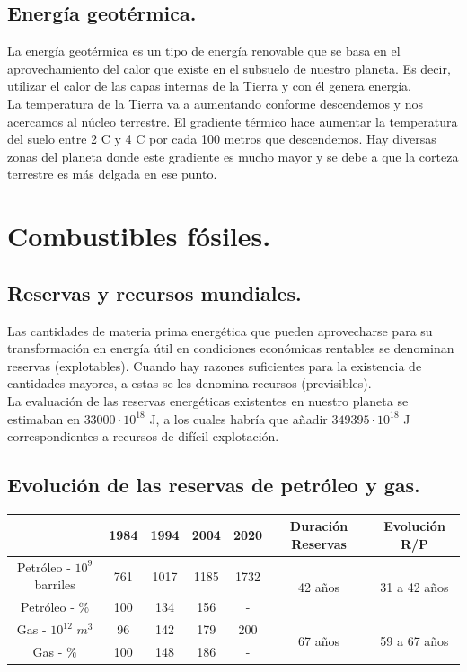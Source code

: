 			\subsection{Energía geotérmica.}
				La energía geotérmica es un tipo de energía renovable que se basa en el aprovechamiento del calor
				que existe en el subsuelo de nuestro planeta. Es decir, utilizar el calor de las capas internas de la
				Tierra y con él genera energía.\\
				\indent La temperatura de la Tierra va a aumentando conforme descendemos y nos acercamos al núcleo
				terrestre. El gradiente térmico hace aumentar la temperatura del suelo entre 2 \textdegree C y 4 \textdegree C por cada 100 metros que descendemos. Hay diversas zonas del planeta donde este gradiente es mucho mayor y se debe
				a que la corteza terrestre es más delgada en ese punto.
		
\section{Combustibles fósiles.}
	\subsection{Reservas y recursos mundiales.}
		Las cantidades de materia prima energética que pueden aprovecharse para su transformación en energía útil en condiciones económicas rentables se denominan reservas (explotables). Cuando hay razones suficientes para la
		existencia de cantidades mayores, a estas se les denomina recursos (previsibles).\\
		\indent La evaluación de las reservas energéticas existentes en nuestro planeta se estimaban en\linebreak
 $33000\cdot10^{18}$ J, a los cuales habría que añadir $349395\cdot10^{18}$ J correspondientes a recursos de difícil explotación.

	\subsection{Evolución de las reservas de petróleo y gas.}
		\begin{center}
			\renewcommand{\arraystretch}{1.4}
			\begin{tabular}{ccccccc}
					\hline
						& \textbf{1984} & \textbf{1994} & \textbf{2004} & \textbf{2020} & \textbf{Duración Reservas} & \textbf{Evolución R/P}\\
					\hline
					Petróleo - $10^9$ barriles & 761 & 1017 & 1185 & 1732 & \multirow{2}{*}{42 años} & \multirow{2}{*}{31 a 42 años}\\
					Petróleo - $\%$ & 100 & 134 & 156 & - & & \\
					\hline
					Gas - $10^{12}$ $\textit{m}^3$	& 96 & 142 & 179 & 200 & \multirow{2}{*}{67 años} & \multirow{2}{*}{59 a 67 años}\\
					Gas - $\%$ & 100 & 148 & 186 & - & & \\
					\hline
			\end{tabular}
		\end{center}
		
